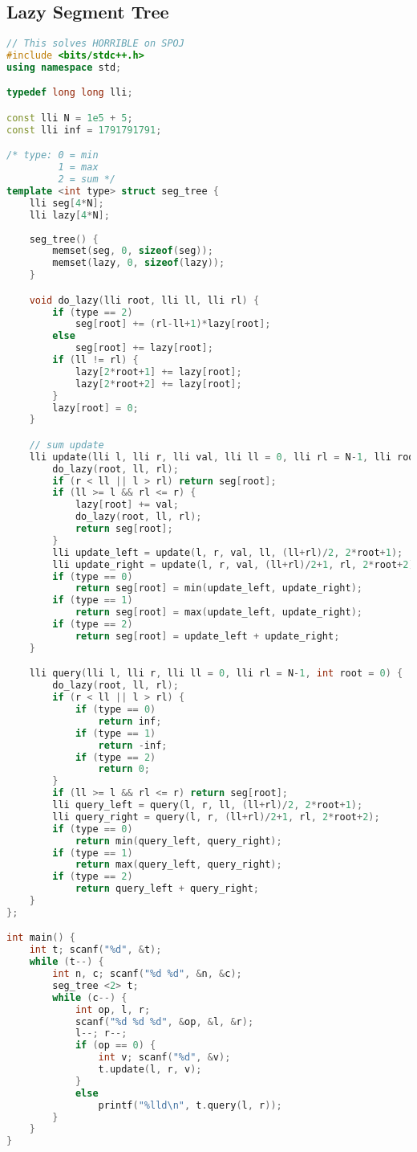 \documentclass{article}
\begin{document}
\subsection{Lazy Segment Tree}
\begin{lstlisting}[language=C++]
// This solves HORRIBLE on SPOJ
#include <bits/stdc++.h>
using namespace std;

typedef long long lli;

const lli N = 1e5 + 5;
const lli inf = 1791791791;

/* type: 0 = min
   		 1 = max
   		 2 = sum */
template <int type> struct seg_tree {
	lli seg[4*N];
	lli lazy[4*N];
	
	seg_tree() {
		memset(seg, 0, sizeof(seg));
		memset(lazy, 0, sizeof(lazy));
	}

	void do_lazy(lli root, lli ll, lli rl) {
		if (type == 2)
			seg[root] += (rl-ll+1)*lazy[root];
		else
			seg[root] += lazy[root];
		if (ll != rl) {
			lazy[2*root+1] += lazy[root];
			lazy[2*root+2] += lazy[root];
		}
		lazy[root] = 0;
	}

	// sum update
	lli update(lli l, lli r, lli val, lli ll = 0, lli rl = N-1, lli root = 0) {
		do_lazy(root, ll, rl);
		if (r < ll || l > rl) return seg[root];
		if (ll >= l && rl <= r) {
			lazy[root] += val;
			do_lazy(root, ll, rl);
			return seg[root];
		}
		lli update_left = update(l, r, val, ll, (ll+rl)/2, 2*root+1);
		lli update_right = update(l, r, val, (ll+rl)/2+1, rl, 2*root+2);
		if (type == 0)	
			return seg[root] = min(update_left, update_right);
		if (type == 1)	
			return seg[root] = max(update_left, update_right);
		if (type == 2)
			return seg[root] = update_left + update_right;
	}

	lli query(lli l, lli r, lli ll = 0, lli rl = N-1, int root = 0) {
		do_lazy(root, ll, rl);
		if (r < ll || l > rl) {
			if (type == 0)
				return inf;
			if (type == 1)
				return -inf;
			if (type == 2)
				return 0;
		}
		if (ll >= l && rl <= r) return seg[root];
		lli query_left = query(l, r, ll, (ll+rl)/2, 2*root+1);
		lli query_right = query(l, r, (ll+rl)/2+1, rl, 2*root+2);
		if (type == 0)
			return min(query_left, query_right);
		if (type == 1)
			return max(query_left, query_right);
		if (type == 2)
			return query_left + query_right;
	}
};

int main() {
	int t; scanf("%d", &t);
	while (t--) {
		int n, c; scanf("%d %d", &n, &c);
		seg_tree <2> t;
		while (c--) {
			int op, l, r;
			scanf("%d %d %d", &op, &l, &r);
			l--; r--;
			if (op == 0) {
				int v; scanf("%d", &v);
				t.update(l, r, v);
			}
			else
				printf("%lld\n", t.query(l, r));
		}
	}
}
\end{lstlisting}
\end{document}
